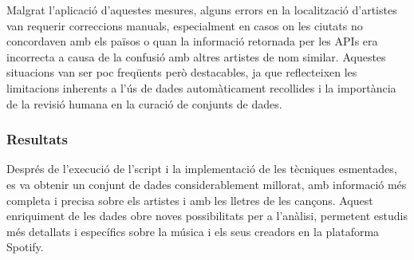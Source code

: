 Malgrat l'aplicació d'aquestes mesures, alguns errors en la localització d'artistes van requerir correccions manuals, especialment en casos on les ciutats no concordaven amb els països o quan la informació retornada per les APIs era incorrecta a causa de la confusió amb altres artistes de nom similar. Aquestes situacions van ser poc freqüents però destacables, ja que reflecteixen les limitacions inherents a l'ús de dades automàticament recollides i la importància de la revisió humana en la curació de conjunts de dades.

\subsubsection{Resultats}

Després de l'execució de l'script i la implementació de les tècniques esmentades, es va obtenir un conjunt de dades considerablement millorat, amb informació més completa i precisa sobre els artistes i amb les lletres de les cançons. Aquest enriquiment de les dades obre noves possibilitats per a l'anàlisi, permetent estudis més detallats i específics sobre la música i els seus creadors en la plataforma Spotify.


